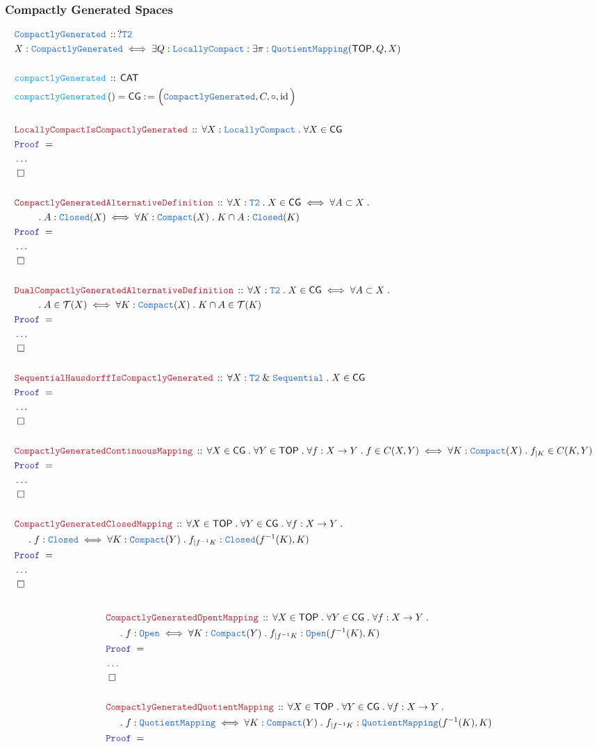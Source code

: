 \documentclass[12pt]{scrartcl}
\newcommand{\TYPE}[1]{\textcolor{NavyBlue}{\mathtt{#1}}}
\newcommand{\FUNC}[1]{\textcolor{Cerulean}{\mathtt{#1}}}
\newcommand{\LOGIC}[1]{\textcolor{Blue}{\mathtt{#1}}}
\newcommand{\THM}[1]{\textcolor{Maroon}{\mathtt{#1}}}
\renewcommand{\.}{\; . \;}
\newcommand{\de}{: \kern 0.1pc =}
\newcommand{\Act}[1]{\left( #1 \right)}
\newcommand{\Theorem}[2]{& \THM{#1} \, :: \, #2 \\ & \Proof = \\ }
\newcommand{\DeclareType}[2]{& \TYPE{#1} \, :: \, #2 \\}
\newcommand{\DefineType}[3]{& #1 : \TYPE{#2} \iff #3 \\}
\newcommand{\DeclareFunc}[2]{& \FUNC{#1} \, :: \, #2 \\}
\newcommand{\DefineNamedFunc}[4]{&  \FUNC{#1}\Act{#2} = #3 \de #4 \\}
\newcommand{\NewLine}{\\ & \kern 1pc}
\newcommand{\Page}[1]{ \begin{align*} #1 \end{align*}   }
\newcommand{\NoProof}{ & \ldots \\ \EndProof}
\renewcommand{\And}{\; \& \;}
\DeclareMathOperator*{\id}{id}
\newcommand{\QED}{\; \square}
\newcommand{\EndProof}{& \QED \\}
\newcommand{\Proof}{\LOGIC{Proof} \; }
\newcommand{\CAT}{\mathsf{CAT}}
\newcommand{\TOP}{\mathsf{TOP}}
\newcommand{\CG}{\mathsf{CG}}
\newcommand{\T}{\mathcal{T}}
\begin{document}
\subsubsection{Compactly Generated Spaces}
\Page{
	\DeclareType{CompactlyGenerated}{?\TYPE{T2}}
	\DefineType{X}{CompactlyGenerated}{\exists Q : \TYPE{LocallyCompact} : \exists \pi : \TYPE{QuotientMapping}(\TOP,Q,X)}
	\\
	\DeclareFunc{compactlyGenerated}{\CAT}
	\DefineNamedFunc{compactlyGenerated}{}{\CG}{\Big( \TYPE{CompactlyGenerated}, C, \circ, \id \Big)}
	\\
	\Theorem{LocallyCompactIsCompactlyGenerated}
	{
		\forall X : \TYPE{LocallyCompact} \.
		\forall X \in \CG
	}
	\NoProof
	\\
	\Theorem{CompactlyGeneratedAlternativeDefinition}
	{
		\forall X : \TYPE{T2} \.
		X \in \CG 
		\iff
		\forall A \subset X \. \NewLine \quad \. 
			A : \TYPE{Closed}(X) 
			\iff 
			\forall K : \TYPE{Compact}(X) \.
			K \cap A : \TYPE{Closed}(K)
	}
	\NoProof
	\\
	\Theorem{DualCompactlyGeneratedAlternativeDefinition}
	{
		\forall X : \TYPE{T2} \.
		X \in \CG 
		\iff
		\forall A \subset X \. \NewLine \quad \. 
			A  \in \T(X) 
			\iff 
			\forall K : \TYPE{Compact}(X) \.
			K \cap A \in \T(K)
	}
	\NoProof
	\\
	\Theorem{SequentialHausdorffIsCompactlyGenerated}
	{
		\forall X : \TYPE{T2} \And \TYPE{Sequential} \.
		X \in \CG	
	}
	\NoProof
	\\
	\Theorem{CompactlyGeneratedContinuousMapping}
	{
		\forall X \in \CG \.
		\forall Y \in \TOP \.
		\forall f : X \to Y \.
		f \in C(X,Y) \iff
		\forall K : \TYPE{Compact}(X) \. 
		f_{|K} \in C(K,Y)
	}
	\NoProof
	\\
	\Theorem{CompactlyGeneratedClosedMapping}
	{
		\forall X \in \TOP \.
		\forall Y \in \CG \.
		\forall f : X \to Y \. \NewLine \.
		f : \TYPE{Closed} \iff
		\forall K : \TYPE{Compact}(Y) \. 
		f_{|f^{-1}K} : \TYPE{Closed}(f^{-1}(K),K) 
	}
	\NoProof
}\Page{
	\\
	\Theorem{CompactlyGeneratedOpentMapping}
	{
		\forall X \in \TOP \.
		\forall Y \in \CG \.
		\forall f : X \to Y \. \NewLine \.
		f : \TYPE{Open} \iff
		\forall K : \TYPE{Compact}(Y) \. 
		f_{|f^{-1}K} : \TYPE{Open}(f^{-1}(K),K) 
	}
	\NoProof
	\\
	\Theorem{CompactlyGeneratedQuotientMapping}
	{
		\forall X \in \TOP \.
		\forall Y \in \CG \.
		\forall f : X \to Y \. \NewLine \.
		f : \TYPE{QuotientMapping} \iff
		\forall K : \TYPE{Compact}(Y) \. 
		f_{|f^{-1}K} : \TYPE{QuotientMapping}(f^{-1}(K),K) 
}}
\end{document}
